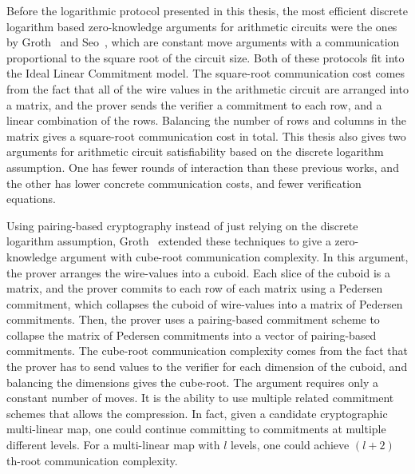 Before the logarithmic protocol presented in this thesis, the most efficient discrete logarithm based zero-knowledge arguments for arithmetic circuits were the ones by Groth~\cite{Groth2009b} and Seo~\cite{Seo2011a}, which are constant move arguments with a communication proportional to the square root of the circuit size. Both of these protocols fit into the Ideal Linear Commitment model. The square-root communication cost comes from the fact that all of the wire values in the arithmetic circuit are arranged into a matrix, and the prover sends the verifier a commitment to each row, and a linear combination of the rows. Balancing the number of rows and columns in the matrix gives a square-root communication cost in total. This thesis also gives two arguments for arithmetic circuit satisfiability based on the discrete logarithm assumption. One has fewer rounds of interaction than these previous works, and the other has lower concrete communication costs, and fewer verification equations.

Using pairing-based cryptography instead of just relying on the discrete logarithm assumption, Groth~\cite{Groth11} extended these techniques to give a zero-knowledge argument with cube-root communication complexity. In this argument, the prover arranges the wire-values into a cuboid. Each slice of the cuboid is a matrix, and the prover commits to each row of each matrix using a Pedersen commitment, which collapses the cuboid of wire-values into a matrix of Pedersen commitments. Then, the prover uses a pairing-based commitment scheme to collapse the matrix of Pedersen commitments into a vector of pairing-based commitments. The cube-root communication complexity comes from the fact that the prover has to send values to the verifier for each dimension of the cuboid, and balancing the dimensions gives the cube-root. The argument requires only a constant number of moves. It is the ability to use multiple related commitment schemes that allows the compression. In fact, given a candidate cryptographic multi-linear map, one could continue committing to commitments at multiple different levels. For a multi-linear map with $l$ levels, one could achieve $(l+2)$th-root communication complexity.

